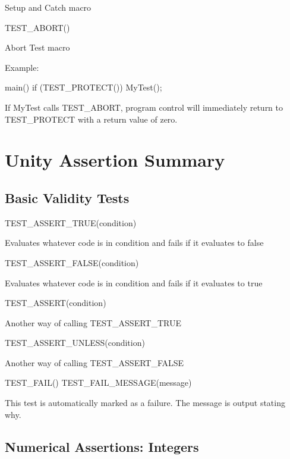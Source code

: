 Setup and Catch macro \begin{DoxyVerb}TEST_ABORT()
\end{DoxyVerb}


Abort Test macro

Example\+: \begin{DoxyVerb}main()
{
    if (TEST_PROTECT())
    {
        MyTest();
    }
}
\end{DoxyVerb}


If My\+Test calls {\ttfamily T\+E\+S\+T\+\_\+\+A\+B\+O\+RT}, program control will immediately return to {\ttfamily T\+E\+S\+T\+\_\+\+P\+R\+O\+T\+E\+CT} with a return value of zero.

\section*{Unity Assertion Summary }

\subsection*{Basic Validity Tests }

\begin{DoxyVerb}TEST_ASSERT_TRUE(condition)
\end{DoxyVerb}


Evaluates whatever code is in condition and fails if it evaluates to false \begin{DoxyVerb}TEST_ASSERT_FALSE(condition)
\end{DoxyVerb}


Evaluates whatever code is in condition and fails if it evaluates to true \begin{DoxyVerb}TEST_ASSERT(condition)
\end{DoxyVerb}


Another way of calling {\ttfamily T\+E\+S\+T\+\_\+\+A\+S\+S\+E\+R\+T\+\_\+\+T\+R\+UE} \begin{DoxyVerb}TEST_ASSERT_UNLESS(condition)
\end{DoxyVerb}


Another way of calling {\ttfamily T\+E\+S\+T\+\_\+\+A\+S\+S\+E\+R\+T\+\_\+\+F\+A\+L\+SE} \begin{DoxyVerb}TEST_FAIL()
TEST_FAIL_MESSAGE(message)
\end{DoxyVerb}


This test is automatically marked as a failure. The message is output stating why.

\subsection*{Numerical Assertions\+: Integers }

